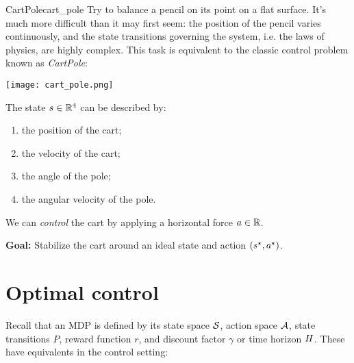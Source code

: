\documentclass[\main/main]{subfiles}
\begin{document}
\begin{example}{CartPole}{cart_pole}
    Try to balance a pencil on its point on a flat surface. It's much more difficult than it may first seem: the position of the pencil varies continuously, and the state transitions governing the system, i.e. the laws of physics, are highly complex.
    This task is equivalent to the classic control problem known as \emph{CartPole}:

    \begin{center}
        \texttt{[image: cart\_pole.png]}
    \end{center}

    The state $\st \in \R^4$ can be described by:

    \begin{enumerate}
        \item the position of the cart;
        \item the velocity of the cart;
        \item the angle of the pole;
        \item the angular velocity of the pole.
    \end{enumerate}

    We can \emph{control} the cart by applying a horizontal force $\act \in \R$.

    \textbf{Goal:} Stabilize the cart around an ideal state and action $(\st^\star, \act^\star)$.
\end{example}




\section{Optimal control}

Recall that an MDP is defined by its state space $\S$, action space $\A$, state transitions $P$, reward function $r$, and discount factor $\gamma$ or time horizon $\hor$. These have equivalents in the control setting:
\end{document}
